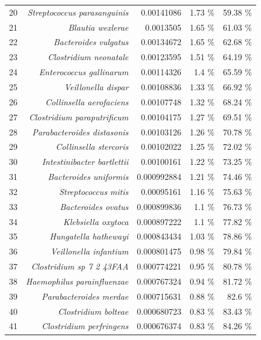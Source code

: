 \documentclass{article}
\begin{document}
\begin{table}[h]
\begin{centering}
\begin{tabular}{|r|r|r|r|r|}
      20 & \textit{Streptococcus parasanguinis} & 0.00141086 & 1.73 \% & 59.38 \% \\
      21 & \textit{Blautia wexlerae} & 0.0013505 & 1.65 \% & 61.03 \% \\
      22 & \textit{Bacteroides vulgatus} & 0.00134672 & 1.65 \% & 62.68 \% \\
      23 & \textit{Clostridium neonatale} & 0.00123595 & 1.51 \% & 64.19 \% \\
      24 & \textit{Enterococcus gallinarum} & 0.00114326 & 1.4 \% & 65.59 \% \\
      25 & \textit{Veillonella dispar} & 0.00108836 & 1.33 \% & 66.92 \% \\
      26 & \textit{Collinsella aerofaciens} & 0.00107748 & 1.32 \% & 68.24 \% \\
      27 & \textit{Clostridium paraputrificum} & 0.00104175 & 1.27 \% & 69.51 \% \\
      28 & \textit{Parabacteroides distasonis} & 0.00103126 & 1.26 \% & 70.78 \% \\
      29 & \textit{Collinsella stercoris} & 0.00102022 & 1.25 \% & 72.02 \% \\
      30 & \textit{Intestinibacter bartlettii} & 0.00100161 & 1.22 \% & 73.25 \% \\
      31 & \textit{Bacteroides uniformis} & 0.000992884 & 1.21 \% & 74.46 \% \\
      32 & \textit{Streptococcus mitis} & 0.00095161 & 1.16 \% & 75.63 \% \\
      33 & \textit{Bacteroides ovatus} & 0.000899836 & 1.1 \% & 76.73 \% \\
      34 & \textit{Klebsiella oxytoca} & 0.000897222 & 1.1 \% & 77.82 \% \\
      35 & \textit{Hungatella hathewayi} & 0.000843434 & 1.03 \% & 78.86 \% \\
      36 & \textit{Veillonella infantium} & 0.000801475 & 0.98 \% & 79.84 \% \\
      37 & \textit{Clostridium sp 7 2 43FAA} & 0.000774221 & 0.95 \% & 80.78 \% \\
      38 & \textit{Haemophilus parainfluenzae} & 0.000767324 & 0.94 \% & 81.72 \% \\
      39 & \textit{Parabacteroides merdae} & 0.000715631 & 0.88 \% & 82.6 \% \\
      40 & \textit{Clostridium bolteae} & 0.000680723 & 0.83 \% & 83.43 \% \\
      41 & \textit{Clostridium perfringens} & 0.000676374 & 0.83 \% & 84.26 \% \\

\end{tabular}
\end{centering}
\end{table}
\end{document}
